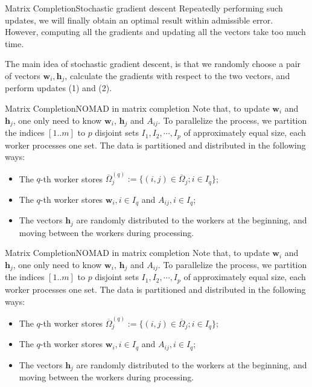 \documentclass{beamer}
\renewcommand{\vec}{\mathbf}
\begin{document}
  \begin{frame}{Matrix Completion}{Stochastic gradient descent}
    Repeatedly performing such updates, we will finally obtain an optimal result within admissible error. However, computing all the gradients and updating all the vectors take too much time. \par
    The main idea of stochastic gradient descent, is that we randomly choose a pair of vectors $\vec{w}_i, \vec{h}_j$, calculate the gradients with respect to the two vectors, and perform updates (1) and (2).
  \end{frame}
  
  \begin{frame}{Matrix Completion}{NOMAD in matrix completion}
    Note that, to update $\vec{w}_i$ and $\vec{h}_j$, one only need to know $\vec{w}_i$, $\vec{h}_j$ and $A_{ij}$. To parallelize the process, we partition the indices $[1..m]$ to $p$ disjoint sets $I_1, I_2, \cdots, I_p$ of approximately equal size, each worker processes one set. The data is partitioned and distributed in the following ways:
    \pause
    \begin{itemize}
      \item The $q$-th worker stores $\overline{\Omega}^{(q)}_j := \{(i, j) \in \overline{\Omega}_j; i \in I_q\}$;
      \item The $q$-th worker stores $\vec{w}_i, i \in I_q$ and $A_{ij}, i \in I_q$;
      \item The vectors $\vec{h}_j$ are randomly distributed to the workers at the beginning, and moving between the workers during processing.
    \end{itemize}
  \end{frame}
  
  \begin{frame}{Matrix Completion}{NOMAD in matrix completion}
    Note that, to update $\vec{w}_i$ and $\vec{h}_j$, one only need to know $\vec{w}_i$, $\vec{h}_j$ and $A_{ij}$. To parallelize the process, we partition the indices $[1..m]$ to $p$ disjoint sets $I_1, I_2, \cdots, I_p$ of approximately equal size, each worker processes one set. The data is partitioned and distributed in the following ways:
    \pause
    \begin{itemize}
      \item The $q$-th worker stores $\overline{\Omega}^{(q)}_j := \{(i, j) \in \overline{\Omega}_j; i \in I_q\}$;
      \item The $q$-th worker stores $\vec{w}_i, i \in I_q$ and $A_{ij}, i \in I_q$;
      \item The vectors $\vec{h}_j$ are randomly distributed to the workers at the beginning, and moving between the workers during processing.
    \end{itemize}
  \end{frame}
  
\end{document}
